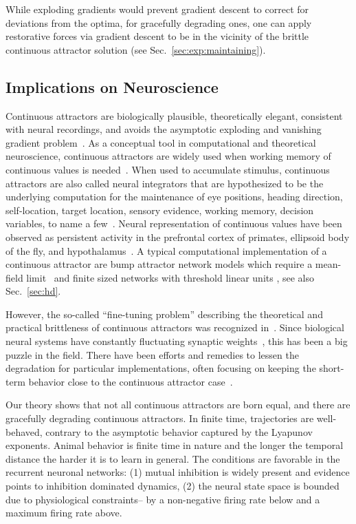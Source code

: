 \documentclass{article}
\newcounter{ct}
\theoremstyle{definition}
\theoremstyle{remark}
\begin{document}
While exploding gradients would prevent gradient descent to correct for deviations from the optima,
for gracefully degrading ones, one can apply restorative forces via gradient descent to be in the vicinity of the brittle continuous attractor solution (see Sec.~\ref{sec:exp:maintaining}).


\subsection{Implications on Neuroscience}\label{sec:imp:neuroscience}
Continuous attractors are biologically plausible, theoretically elegant, consistent with neural recordings, and avoids the asymptotic exploding and vanishing gradient problem~\cite{Park2023a}.
As a conceptual tool in computational and theoretical neuroscience, continuous attractors are widely used when working memory of continuous values is needed~\cite{Dayan2001,Burak2009,Khona2022}.
When used to accumulate stimulus, continuous attractors are also called neural integrators that are hypothesized to be the underlying computation for the maintenance of eye positions, heading direction, self-location, target location, sensory evidence, working memory, decision variables, to name a few~\cite{seung1996,Seung2000,Romo1999}.
Neural representation of continuous values have been observed as persistent activity in the prefrontal cortex of primates, ellipsoid body of the fly, and hypothalamus~\cite{Romo1999,Noorman2022,Nair2023}.
A typical computational implementation of a continuous attractor are bump attractor network models which require a mean-field limit~\cite{Skaggs1995,Camperi1998,Renart2003} and finite sized networks with threshold linear units \cite{Noorman2022,Spalla2021}, see also Sec.~\ref{sec:hd}.

However, the so-called ``fine-tuning problem'' describing the theoretical and practical brittleness of continuous attractors was recognized in~\citep{seung1998}.
Since biological neural systems have constantly fluctuating synaptic weights~\cite{shimizu2021}, this has been a big puzzle in the field.
There have been efforts and remedies to lessen the degradation for particular implementations, often focusing on keeping the short-term behavior close to the continuous attractor case~\cite{Lim2012,Lim2013,Boerlin2013,Koulakov2002,Renart2003}.

Our theory shows that not all continuous attractors are born equal, and there are gracefully degrading continuous attractors.
In finite time, trajectories are well-behaved, contrary to the asymptotic behavior captured by the Lyapunov exponents.
Animal behavior is finite time in nature and the longer the temporal distance the harder it is to learn in general.
The conditions are favorable in the recurrent neuronal networks: (1) mutual inhibition is widely present and evidence points to inhibition dominated dynamics,
(2) the neural state space is bounded due to physiological constraints-- by a non-negative firing rate below and a maximum firing rate above.
\end{document}
